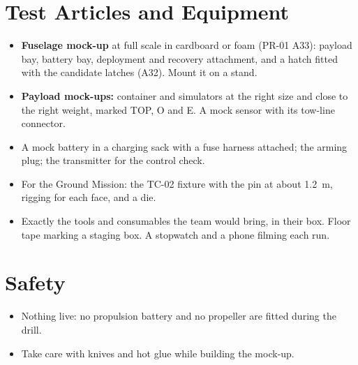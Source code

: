 \documentclass[final]{dbfdoc}
\begin{document}
\section{Test Articles and Equipment}
\begin{itemize}
\item \textbf{Fuselage mock-up} at full scale in cardboard or foam (PR-01 A33): payload bay, battery bay, deployment and recovery attachment, and a hatch fitted with the candidate latches (A32). Mount it on a stand.
\item \textbf{Payload mock-ups:} container and simulators at the right size and close to the right weight, marked TOP, O and E. A mock sensor with its tow-line connector.
\item A mock battery in a charging sack with a fuse harness attached; the arming plug; the transmitter for the control check.
\item For the Ground Mission: the TC-02 fixture with the pin at about 1.2~m, rigging for each face, and a die.
\item Exactly the tools and consumables the team would bring, in their box. Floor tape marking a staging box. A stopwatch and a phone filming each run.
\end{itemize}

\section{Safety}
\begin{itemize}
\item Nothing live: no propulsion battery and no propeller are fitted during the drill.
\item Take care with knives and hot glue while building the mock-up.
\end{itemize}
\end{document}
